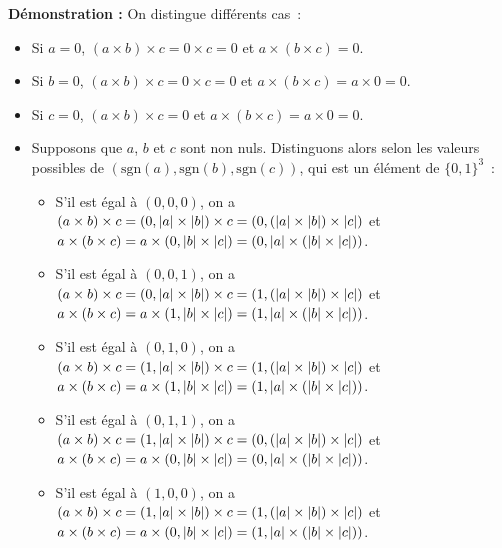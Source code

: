 \noindent\textbf{Démonstration :} On distingue différents cas : 
    \begin{itemize}[nosep]
        \item Si $a = 0$, $(a \times b) \times c = 0 \times c = 0$ et $a \times (b \times c) = 0$.
        \item Si $b = 0$, $(a \times b) \times c = 0 \times c = 0$ et $a \times (b \times c) = a \times 0 = 0$.
        \item Si $c = 0$, $(a \times b) \times c = 0$ et $a \times (b \times c) = a \times 0 = 0$.
        \item Supposons que $a$, $b$ et $c$ sont non nuls. 
            Distinguons alors selon les valeurs possibles de $(\mathrm{sgn}(a), \mathrm{sgn}(b), \mathrm{sgn}(c))$, qui est un élément de $\lbrace 0, 1 \rbrace^3$ :
            \begin{itemize}[nosep]
                \item S'il est égal à $(0,0,0)$, on a 
                    $(a \times b) \times c = (0,\left\lvert a \right\rvert \times \left\lvert b \right\rvert) \times c = (0, (\left\lvert a \right\rvert \times \left\lvert b \right\rvert) \times \left\lvert c \right\rvert)$ et 
                    $a \times (b \times c) = a \times (0, \left\lvert b \right\rvert \times \left\lvert c \right\rvert) = (0, \left\lvert a \right\rvert \times (\left\lvert b \right\rvert \times \left\lvert c \right\rvert))$.
                \item S'il est égal à $(0,0,1)$, on a 
                    $(a \times b) \times c = (0,\left\lvert a \right\rvert \times \left\lvert b \right\rvert) \times c = (1, (\left\lvert a \right\rvert \times \left\lvert b \right\rvert) \times \left\lvert c \right\rvert)$ et 
                    $a \times (b \times c) = a \times (1, \left\lvert b \right\rvert \times \left\lvert c \right\rvert) = (1, \left\lvert a \right\rvert \times (\left\lvert b \right\rvert \times \left\lvert c \right\rvert))$.
                \item S'il est égal à $(0,1,0)$, on a 
                    $(a \times b) \times c = (1,\left\lvert a \right\rvert \times \left\lvert b \right\rvert) \times c = (1, (\left\lvert a \right\rvert \times \left\lvert b \right\rvert) \times \left\lvert c \right\rvert)$ et 
                    $a \times (b \times c) = a \times (1, \left\lvert b \right\rvert \times \left\lvert c \right\rvert) = (1, \left\lvert a \right\rvert \times (\left\lvert b \right\rvert \times \left\lvert c \right\rvert))$.
                \item S'il est égal à $(0,1,1)$, on a 
                    $(a \times b) \times c = (1,\left\lvert a \right\rvert \times \left\lvert b \right\rvert) \times c = (0, (\left\lvert a \right\rvert \times \left\lvert b \right\rvert) \times \left\lvert c \right\rvert)$ et 
                    $a \times (b \times c) = a \times (0, \left\lvert b \right\rvert \times \left\lvert c \right\rvert) = (0, \left\lvert a \right\rvert \times (\left\lvert b \right\rvert \times \left\lvert c \right\rvert))$.
                \item S'il est égal à $(1,0,0)$, on a 
                    $(a \times b) \times c = (1,\left\lvert a \right\rvert \times \left\lvert b \right\rvert) \times c = (1, (\left\lvert a \right\rvert \times \left\lvert b \right\rvert) \times \left\lvert c \right\rvert)$ et 
                    $a \times (b \times c) = a \times (0, \left\lvert b \right\rvert \times \left\lvert c \right\rvert) = (1, \left\lvert a \right\rvert \times (\left\lvert b \right\rvert \times \left\lvert c \right\rvert))$.

\end{itemize}
\end{itemize}
